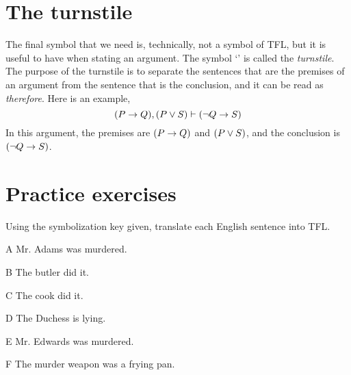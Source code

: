 \section{The turnstile}

The final symbol that we need is, technically, not a symbol of TFL, but it is useful to have when stating an argument. The symbol `\proves' is called the \textit{turnstile}. The purpose of the turnstile is to separate the sentences that are the premises of an argument from the sentence that is the conclusion, and it can be read as \textit{therefore}. Here is an example,
$$(P \rightarrow Q), (P \vee S) \vdash ({\neg} Q \rightarrow S)$$
In this argument, the premises are $(P \rightarrow Q)$ and $(P \vee S)$, and the conclusion is $({\neg} Q \rightarrow S)$.








\section{Practice exercises}
\setcounter{ProbPart}{0}


\problempart Using the symbolization key given, translate each English sentence into TFL.
\begin{ekey}
\item[A] Mr. Adams was murdered.
\item[B] The butler did it.
\item[C] The cook did it.
\item[D] The Duchess is lying.
\item[E] Mr. Edwards was murdered.
\item[F] The murder weapon was a frying pan.
\end{ekey}

